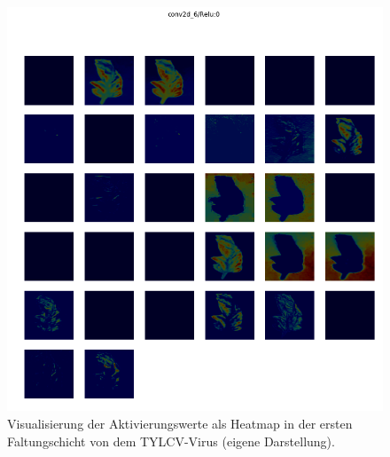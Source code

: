 
\begin{figure}[h!]
	\centering
	\includegraphics[width=\textwidth]{visualisierungen/yellow/heapmap_mit/conv2d_6.png}
	\caption{Visualisierung der Aktivierungswerte als Heatmap in der ersten Faltungschicht von dem TYLCV-Virus (eigene Darstellung).}
	\label{}
\end{figure}


